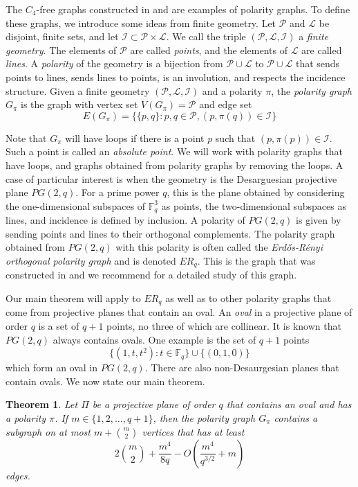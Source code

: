 \documentclass[12pt]{article}
\newtheorem{theorem}{Theorem}[section]
\begin{document}
The $C_4$-free graphs constructed in \cite{b} and \cite{ers} are examples of polarity graphs.  To define these graphs, we introduce some ideas from finite geometry.  Let $\mathcal{P}$ and $\mathcal{L}$ be disjoint, finite sets, and let $\mathcal{I}\subset \mathcal{P}\times \mathcal{L}$. We call the triple $(\mathcal{P}, \mathcal{L}, \mathcal{I})$ a {\em finite geometry}.  The elements of $\mathcal{P}$ are called {\em points}, and the elements of $\mathcal{L}$ are called {\em lines}.   A {\em polarity} of the geometry is a bijection from $\mathcal{P}\cup \mathcal{L}$ to $\mathcal{P}\cup \mathcal{L}$ that sends points to lines, sends lines to points, is an involution, and respects the incidence structure.  Given a finite geometry $(\mathcal{P}, \mathcal{L}, \mathcal{I})$ and a polarity $\pi$, the {\em polarity graph} $G_\pi$ is the graph with vertex set $V(G_\pi) = \mathcal{P}$ and edge set
$$E(G_\pi) = \{\{p,q\}: p,q\in \mathcal{P}, (p, \pi(q))\in \mathcal{I}\}$$

Note that $G_\pi$ will have loops if there is a point $p$ such that $(p, \pi(p))\in \mathcal{I}$.
Such a point is called an {\em absolute point}. We will work with polarity graphs that have loops, and graphs obtained from polarity graphs by removing the loops.  A case of particular interest is when the geometry is
the Desarguesian projective plane $PG(2,q)$.   For a prime power $q$, this is the plane obtained by considering the one-dimensional subspaces of $\mathbb{F}_q^3$ as points, the two-dimensional subspaces as lines, and incidence is defined by inclusion. A polarity of $PG(2,q)$ is given by sending points and lines to their orthogonal complements. The polarity graph obtained from $PG(2,q)$ with this polarity is often called the {\em Erd\H{o}s-R\'{e}nyi orthogonal polarity graph} and is denoted $ER_q$.  This is the graph that was constructed in \cite{b, ers} and we recommend \cite{bs} for a detailed study of this graph.

Our main theorem will apply to $ER_q$ as well as to other polarity graphs that come from projective planes that contain an oval.
An \emph{oval} in a projective plane of order $q$ is a set of $q+1$ points, no three of which are collinear.  It is known that $PG(2,q)$ always contains ovals.  One example is the set of $q+1$ points
$$\{(1 , t , t^2 ) : t \in \mathbb{F}_q \} \cup \{ (0,1,0) \}$$
which form an oval in $PG(2,q)$.  There are also non-Desaurgesian planes that contain ovals.  We now state our main theorem.

\begin{theorem}\label{dense subgraph}
    Let $\Pi$ be a projective plane of order $q$ that contains an oval and has a polarity $\pi$.  If $m \in \{1,2, \dots , q + 1 \}$, then the polarity graph $G_{ \pi}$ contains a subgraph on at most $m + \binom{m}{2}$ vertices that has at least
    $$2 \binom{m}{2} + \frac{m^4}{8q} - O \left( \frac{m^4}{q^{3/2} } + m \right)$$
    edges.
\end{theorem}
\end{document}
